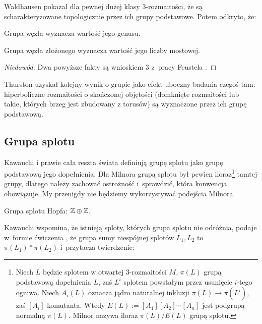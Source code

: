 Waldhausen \cite{waldhausen1968} pokazał dla pewnej dużej klasy 3-rozmaitości, że są scharakteryzowane topologicznie przez ich grupy podstawowe.
%
Potem odkryto, że:

\begin{proposition}
    Grupa węzła wyznacza wartość jego genusu.
\end{proposition}

\begin{proposition}
    Grupa węzła złożonego wyznacza wartość jego liczby mostowej.
\end{proposition}

\begin{proof}[Niedowód]
    Dwa powyższe fakty są wnioskiem 3 z~pracy Feustela \cite{feustel1978}.
\end{proof}

Thurston \cite{thurston1982} uzyskał kolejny wynik o grupie jako efekt uboczny badania czegoś tam: hiperboliczne rozmaitości o skończonej objętości (domknięte rozmaitości lub takie, których brzeg jest zbudowany z torusów) są wyznaczone przez ich grupę podstawową.
%

\subsection{Grupa splotu}

Kawauchi \cite[s. 73]{kawauchi1996} i prawie cała reszta świata definiują grupę splotu jako grupę podstawową jego dopełnienia.
Dla Milnora \cite{milnor1954} grupą splotu był pewien iloraz\footnote{%
Niech $L$ będzie splotem w otwartej 3-rozmaitości $M$, $\pi(L)$ grupą podstawową dopełnienia $L$, zaś $L^i$ splotem powstałym przez usunięcie $i$-tego ogniwa.
Niech $A_i(L)$ oznacza jądro naturalnej inkluzji $\pi(L) \to \pi(L^i)$, zaś $[A_i]$ komutanta.
Wtedy $E(L) := [A_1][A_2] \cdots [A_n]$ jest podgrupą normalną $\pi(L)$.
Milnor nazywa iloraz $\pi(L) / E(L)$ grupą splotu.%
} tamtej grupy, dlatego należy zachować ostrożność i~sprawdzić, która konwencja obowiązuje.
My przenigdy nie będziemy wykorzystywać podejścia Milnora.

\begin{example}
    Grupa splotu Hopfa: $\mathbb Z \oplus \mathbb Z$.
\end{example}

Kawauchi wspomina, że istnieją sploty, których grupa splotu nie odróżnia, podaje w~formie ćwiczenia \cite[s. 73]{kawauchi1996}, że grupa sumy niespójnej splotów $L_1, L_2$ to $\pi(L_1) * \pi(L_2)$ i~przytacza twierdzenie:

